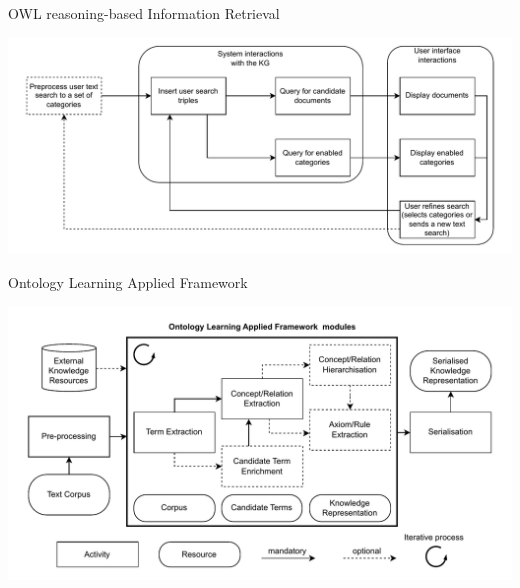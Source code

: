 \begin{frame}{OWL reasoning-based Information Retrieval}

        \begin{center}
            \includegraphics[scale=0.6]{images/ir-onto-search-process.pdf} 
        \end{center}

\end{frame}

\begin{frame}{Ontology Learning Applied Framework}

        \begin{center}
            \includegraphics[scale=0.6]{images/olaf-modules.pdf} 
        \end{center}

\end{frame}


